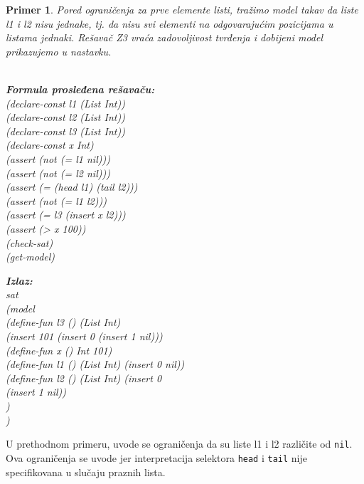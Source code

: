 \documentclass[12pt,oneside]{memoir}
\newcommand\tab[1][0.5cm]{\hspace*{#1}}
\newtheorem{primer}{Primer}
\begin{document}
\begin{primer} \label{example14}
Pored ograničenja za prve elemente listi, tražimo model takav da liste l1 i l2 nisu jednake, tj. da nisu svi elementi na odgovarajućim pozicijama u listama jednaki. Rešavač Z3 vraća zadovoljivost tvrđenja i dobijeni model prikazujemo u nastavku.
\\ \\
\begin{minipage}[b]{0.42\textwidth}
\textbf{Formula prosleđena rešavaču:}
\\(declare-const l1 (List Int))
\\(declare-const l2 (List Int))
\\(declare-const l3 (List Int))
\\(declare-const x Int)
\\(assert (not (= l1 nil)))
\\(assert (not (= l2 nil)))
\\(assert (= (head l1) (tail l2)))
\\(assert (not (= l1 l2)))
\\(assert (= l3 (insert x l2)))
\\(assert (> x 100))
\\(check-sat)
\\(get-model)
\end{minipage}
\hspace{0.9cm}
\begin{minipage}[t]{0.55\textwidth}
\vspace{-7.84cm}
\textbf{Izlaz:}
\\sat 
\\(model 
\\\tab(define-fun l3 () (List Int) 
\\\tab(insert 101 (insert 0 (insert 1 nil)))
\\\tab(define-fun x () Int 101) 
\\\tab(define-fun l1 () (List Int) (insert 0 nil)) 
\\\tab(define-fun l2 () (List Int) (insert 0 
\\\tab\tab(insert 1 nil))
\\\tab)
\\) 
\end{minipage}


\end{primer}

U prethodnom primeru, uvode se ograničenja da su liste l1 i l2 različite od \texttt{nil}. Ova ograničenja se uvode jer interpretacija selektora \texttt{head} i \texttt{tail} 
nije specifikovana u slučaju praznih lista.
\end{document}
